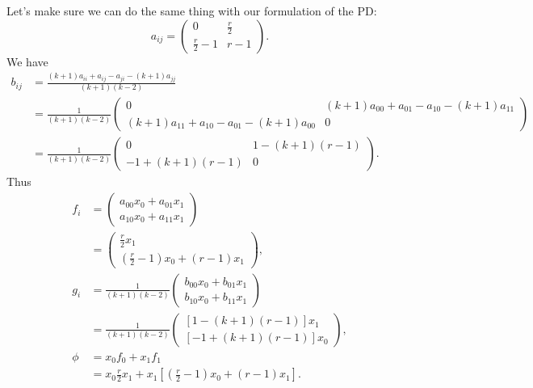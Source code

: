 \documentclass[13pt]{amsart}
\begin{document}
Let's make sure we can do the same thing with our formulation of the PD:
\begin{equation}
    a_{ij} =
    \begin{pmatrix}
        0 & \frac{r}{2} \\
        \frac{r}{2} - 1 & r - 1
    \end{pmatrix}.
\end{equation}
We have
\begin{equation}
    \begin{split}
        b_{ij} & =
        \frac{(k+1)a_{ii} + a_{ij} - a_{ji} - (k+1)a_{jj}}{(k+1)(k-2)}
        \\
        & = \frac{1}{(k+1)(k-2)}
        \begin{pmatrix}
            0 & (k+1)a_{00} + a_{01} - a_{10} - (k+1)a_{11} \\
            (k+1)a_{11} + a_{10} - a_{01} - (k+1)a_{00} & 0
        \end{pmatrix}
        \\
        & = \frac{1}{(k+1)(k-2)}
        \begin{pmatrix}
            0 & 1 - (k+1)(r-1) \\
            -1 + (k+1)(r-1) & 0
        \end{pmatrix}.
    \end{split}
\end{equation}
Thus
\begin{equation}
    \begin{split}
        f_i & =
        \begin{pmatrix}
            a_{00}x_0 + a_{01}x_1 \\
            a_{10}x_0 + a_{11}x_1
        \end{pmatrix}
        \\
        & =
        \begin{pmatrix}
            \frac{r}{2}x_1 \\
            (\frac{r}{2} - 1)x_0 + (r-1) x_1
        \end{pmatrix},
        \\
        g_i & = \frac{1}{(k+1)(k-2)}
        \begin{pmatrix}
            b_{00}x_0 + b_{01}x_1\\
            b_{10}x_0 + b_{11}x_1
        \end{pmatrix}
        \\
        & = \frac{1}{(k+1)(k-2)}
        \begin{pmatrix}
            [1 - (k+1)(r-1)]x_1\\
            [-1 + (k+1)(r-1)]x_0
        \end{pmatrix},
        \\
        \phi & = x_0 f_0 + x_1 f_1
        \\
        & = x_0 \frac{r}{2}x_1 + x_1[(\frac{r}{2} - 1)x_0 + (r-1) x_1].
    \end{split}
\end{equation}
\end{document}
